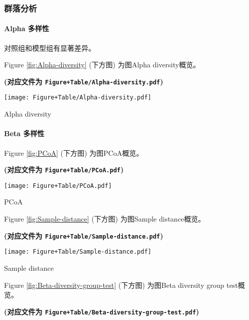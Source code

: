 \documentclass[
]{article}
\begin{document}
\hypertarget{ux7fa4ux843dux5206ux6790}{%
\subsubsection{群落分析}\label{ux7fa4ux843dux5206ux6790}}

\hypertarget{alpha}{%
\paragraph{Alpha 多样性}\label{alpha}}

对照组和模型组有显著差异。

Figure \ref{fig:Alpha-diversity} (下方图) 为图Alpha diversity概览。

\textbf{(对应文件为 \texttt{Figure+Table/Alpha-diversity.pdf})}

\def\@captype{figure}
\begin{center}
\texttt{[image: Figure+Table/Alpha-diversity.pdf]}
\caption{Alpha diversity}\label{fig:Alpha-diversity}
\end{center}

\hypertarget{beta}{%
\paragraph{Beta 多样性}\label{beta}}

Figure \ref{fig:PCoA} (下方图) 为图PCoA概览。

\textbf{(对应文件为 \texttt{Figure+Table/PCoA.pdf})}

\def\@captype{figure}
\begin{center}
\texttt{[image: Figure+Table/PCoA.pdf]}
\caption{PCoA}\label{fig:PCoA}
\end{center}

Figure \ref{fig:Sample-distance} (下方图) 为图Sample distance概览。

\textbf{(对应文件为 \texttt{Figure+Table/Sample-distance.pdf})}

\def\@captype{figure}
\begin{center}
\texttt{[image: Figure+Table/Sample-distance.pdf]}
\caption{Sample distance}\label{fig:Sample-distance}
\end{center}

Figure \ref{fig:Beta-diversity-group-test} (下方图) 为图Beta diversity group test概览。

\textbf{(对应文件为 \texttt{Figure+Table/Beta-diversity-group-test.pdf})}
\end{document}
